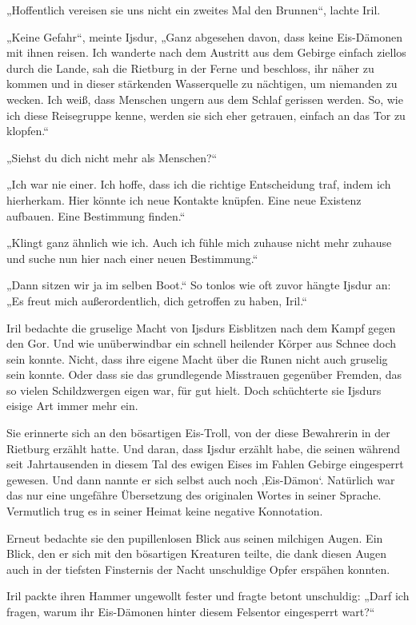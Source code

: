 „Hoffentlich vereisen sie uns nicht ein zweites Mal den Brunnen“, lachte Iril.

„Keine Gefahr“, meinte Ijsdur, „Ganz abgesehen davon, dass keine Eis-Dämonen mit ihnen reisen. Ich wanderte nach dem Austritt aus dem Gebirge einfach ziellos durch die Lande, sah die Rietburg in der Ferne und beschloss, ihr näher zu kommen und in dieser stärkenden Wasserquelle zu nächtigen, um niemanden zu wecken. Ich weiß, dass Menschen ungern aus dem Schlaf gerissen werden. So, wie ich diese Reisegruppe kenne, werden sie sich eher getrauen, einfach an das Tor zu klopfen.“

„Siehst du dich nicht mehr als Menschen?“

„Ich war nie einer. Ich hoffe, dass ich die richtige Entscheidung traf, indem ich hierherkam. Hier könnte ich neue Kontakte knüpfen. Eine neue Existenz aufbauen. Eine Bestimmung finden.“

„Klingt ganz ähnlich wie ich. Auch ich fühle mich zuhause nicht mehr zuhause und suche nun hier nach einer neuen Bestimmung.“

„Dann sitzen wir ja im selben Boot.“ So tonlos wie oft zuvor hängte Ijsdur an: „Es freut mich außerordentlich, dich getroffen zu haben, Iril.“

Iril bedachte die gruselige Macht von Ijsdurs Eisblitzen nach dem Kampf gegen den Gor. Und wie unüberwindbar ein schnell heilender Körper aus Schnee doch sein konnte. Nicht, dass ihre eigene Macht über die Runen nicht auch gruselig sein konnte. Oder dass sie das grundlegende Misstrauen gegenüber Fremden, das so vielen Schildzwergen eigen war, für gut hielt. Doch schüchterte sie Ijsdurs eisige Art immer mehr ein.

Sie erinnerte sich an den bösartigen Eis-Troll, von der diese Bewahrerin in der Rietburg erzählt hatte. Und daran, dass Ijsdur erzählt habe, die seinen während seit Jahrtausenden in diesem Tal des ewigen Eises im Fahlen Gebirge eingesperrt gewesen. Und dann nannte er sich selbst auch noch ‚Eis-Dämon‘. Natürlich war das nur eine ungefähre Übersetzung des originalen Wortes in seiner Sprache. Vermutlich trug es in seiner Heimat keine negative Konnotation.

Erneut bedachte sie den pupillenlosen Blick aus seinen milchigen Augen. Ein Blick, den er sich mit den bösartigen Kreaturen teilte, die dank diesen Augen auch in der tiefsten Finsternis der Nacht unschuldige Opfer erspähen konnten.

Iril packte ihren Hammer ungewollt fester und fragte betont unschuldig: „Darf ich fragen, warum ihr Eis-Dämonen hinter diesem Felsentor eingesperrt wart?“

